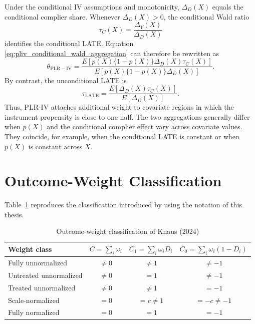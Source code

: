 \documentclass[12pt, a4paper, oneside]{article}
\theoremstyle{plain}
\theoremstyle{definition}
\begin{document}
Under the conditional IV assumptions and monotonicity,
\(\Delta_D(X)\) equals the conditional complier share. Whenever
\(\Delta_D(X)>0\), the conditional Wald ratio
\[
    \tau_C(X)
    =
    \frac{\Delta_Y(X)}{\Delta_D(X)}
\]
identifies the conditional LATE. Equation
\eqref{eq:pliv_conditional_wald_aggregation} can therefore be rewritten as
\begin{equation}
    \theta_{\mathrm{PLR-IV}}
    =
    \frac{
      E[p(X)\{1-p(X)\}\Delta_D(X)\tau_C(X)]
    }{
      E[p(X)\{1-p(X)\}\Delta_D(X)]
    }.
\end{equation}
By contrast, the unconditional LATE is
\begin{equation}
    \tau_{\mathrm{LATE}}
    =
    \frac{
      E[\Delta_D(X)\tau_C(X)]
    }{
      E[\Delta_D(X)]
    }.
\end{equation}
Thus, PLR-IV attaches additional weight to covariate regions in which the
instrument propensity is close to one half. The two aggregations generally
differ when \(p(X)\) and the conditional complier effect vary across
covariate values. They coincide, for example, when the conditional LATE is
constant or when \(p(X)\) is constant across \(X\).


\section{Outcome-Weight Classification}
Table~\ref{tab:knaus_weight_classes} reproduces the classification introduced
by \citet[Table~4]{knaus2024treatment} using the notation of this thesis.
\begin{table}[H]
\centering
\caption{Outcome-weight classification of Knaus (2024)}
\label{tab:knaus_weight_classes}
\begin{tabular}{lccc}
\toprule
Weight class
& \(C=\sum_i\omega_i\)
& \(C_1=\sum_i\omega_iD_i\)
& \(C_0=\sum_i\omega_i(1-D_i)\) \\
\midrule
Fully unnormalized
& \(\neq 0\)
& \(\neq 1\)
& \(\neq -1\) \\

Untreated unnormalized
& \(\neq 0\)
& \(=1\)
& \(\neq -1\) \\

Treated unnormalized
& \(\neq 0\)
& \(\neq 1\)
& \(=-1\) \\

Scale-normalized
& \(=0\)
& \(=c\neq1\)
& \(=-c\neq-1\) \\

Fully normalized
& \(=0\)
& \(=1\)
& \(=-1\) \\
\bottomrule
\end{tabular}
\end{table}
\end{document}
